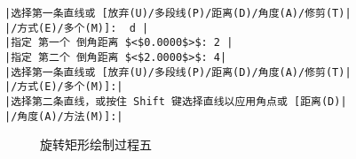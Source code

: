 \begin{procedure}
\begin{lstlisting}
|选择第一条直线或 [放弃(U)/多段线(P)/距离(D)/角度(A)/修剪(T)|
|/方式(E)/多个(M)]:  d |
|指定 第一个 倒角距离 $<$0.0000$>$: 2 |
|指定 第二个 倒角距离 $<$2.0000$>$: 4|
|选择第一条直线或 [放弃(U)/多段线(P)/距离(D)/角度(A)/修剪(T)|
|/方式(E)/多个(M)]:|
|选择第二条直线，或按住 Shift 键选择直线以应用角点或 [距离(D)|
|/角度(A)/方法(M)]:|
\end{lstlisting}
\begin{figure}[htbp]
\centering
{}\hspace{30pt}
\caption{旋转矩形绘制过程五}
\end{figure}

\end{procedure}
\endinput
